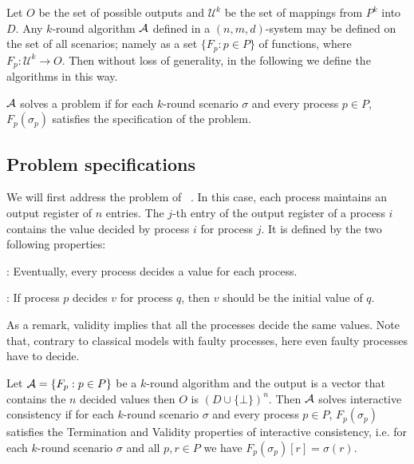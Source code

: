 {{Let $O$ be the set of possible outputs and $\mathcal{U}^{k}$ be the
set of mappings from $P^{k}$ into $D$.
Any $k$-round algorithm $\cal A$ defined in a $(n,m,d)$-system
may be defined  on the set of all scenarios; namely as a set $\{ F_{p}
: p \in P \}$ of functions, 
where $F_{p} : \mathcal{U}^{k}  \rightarrow O$. 
Then without loss of generality,  in the following we define the  algorithms
in this way.

 $\cal A$ solves a problem 
 if for each $k$-round scenario $\sigma$ and every process $p
\in P$,  $F_{p} ( \sigma_{p} )$ satisfies the specification of the
problem.




\subsection{Problem specifications}
We will first address the problem of {}~\cite{fischer1983consensus}. 
In this case, each process maintains an output register of $n$ entries. 
The $j$-th entry of the output register of a process $i$ contains the value decided by process $i$ for process $j$.
It is defined by the  two following properties:
\begin{itemizedot}
  \item {}: Eventually, every process decides a value for
  each process.
  
  \item {}: If process $p$ decides $v$ for process $q$, then
  $v$ should be the initial value of $q$.
\end{itemizedot}
As a remark, validity implies that all the processes decide the same
values.
Note that, contrary to classical models with faulty processes, here
even faulty processes have to decide. 

Let ${\cal A}= \{
F_{p} :p \in P \}$ be a $k$-round algorithm and the output is a vector that contains the  $n$ decided values then  $O$ is $(D\cup \{\bot\})^n$.
Then $\cal A$ solves  interactive
consistency if for each $k$-round scenario $\sigma$ and 
every process $p
\in P$,  $F_{p} ( \sigma_{p} )$ satisfies the Termination and Validity properties of interactive consistency, i.e.
for each $k$-round scenario $\sigma$ and all $p,r
\in P$ we have $F_{p} ( \sigma_{p} )[r] = \sigma ( r )$.


}}
